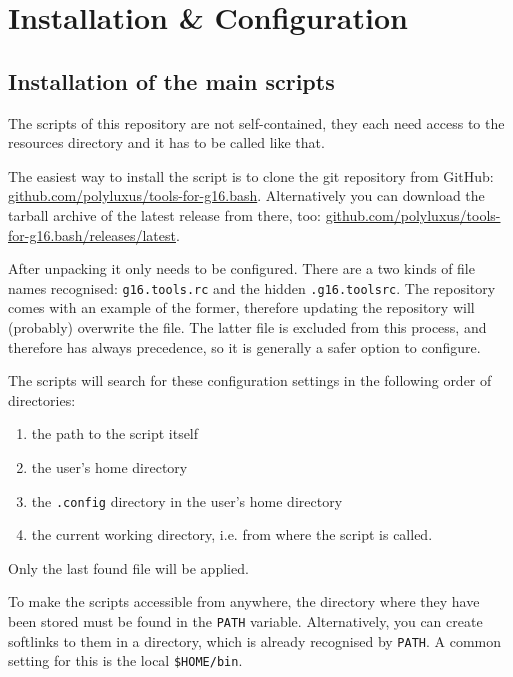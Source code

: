 \documentclass[   %
  final,          %
  a4paper         %
]{article}
\begin{document}
\section{Installation \& Configuration}
\label{sec:installation}

\subsection{Installation of the main scripts}

The scripts of this repository are not self-contained,
they each need access to the resources directory 
and it has to be called like that.

The easiest way to install the script is to clone the git repository from GitHub:\newline
\href{https://github.com/polyluxus/tools-for-g16.bash}{github.com/polyluxus/tools-for-g16.bash}.
Alternatively you can download the tarball archive of the latest release from there, too:\newline
\href{https://github.com/polyluxus/tools-for-g16.bash/releases/latest}{github.com/polyluxus/tools-for-g16.bash/releases/latest}.

After unpacking it only needs to be configured.
There are a two kinds of file names recognised:
\lstinline`g16.tools.rc` and the hidden \lstinline`.g16.toolsrc`.
The repository comes with an example of the former, 
therefore updating the repository will (probably) overwrite the file.
The latter file is excluded from this process,
and therefore has always precedence, 
so it is generally a safer option to configure.

The scripts will search for these configuration settings in the following order of directories:
\begin{enumerate}
  \item the path to the script itself 
  \item the user's home directory
  \item the \texttt{.config} directory in the user's home directory
  \item the current working directory, i.e. from where the script is called.
\end{enumerate}
Only the last found file will be applied.

To make the scripts accessible from anywhere, the directory where they have been stored
must be found in the \texttt{PATH} variable.
Alternatively, you can create softlinks to them in a directory, 
which is already recognised by \texttt{PATH}.
A common setting for this is the local \texttt{\$HOME/bin}.
\end{document}
